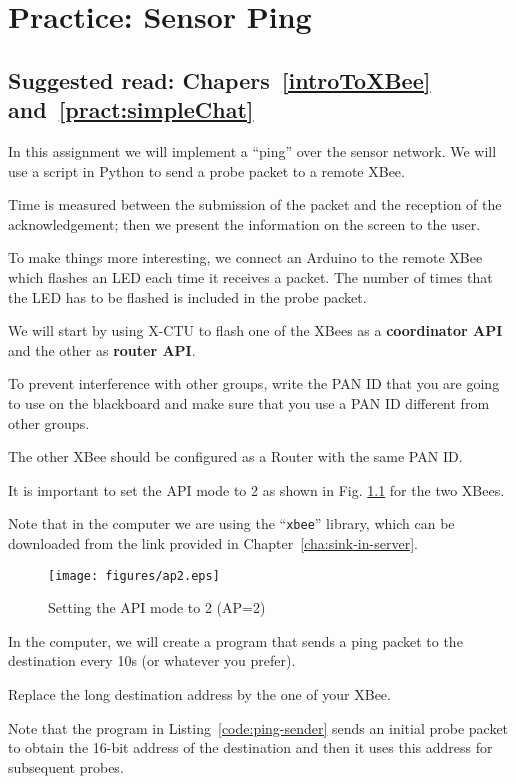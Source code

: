 \chapter{Practice: Sensor Ping}
\section*{Suggested read: Chapers~\ref{introToXBee} and~\ref{pract:simpleChat}}

In this assignment we will implement a ``ping'' over the sensor network. We will use a script in Python to send a probe packet to a remote XBee.

Time is measured between the submission of the packet and the reception of the acknowledgement; then we present the information on the screen to the user.

To make things more interesting, we connect an Arduino to the remote XBee which flashes an LED each time it receives a packet.
The number of times that the LED has to be flashed is included in the probe packet.

We will start by using X-CTU to flash one of the XBees as a {\bfseries coordinator API} and the other as {\bfseries router API}.

To prevent interference with other groups, write the PAN ID that you are going to use on the blackboard and make sure that you use a PAN ID different from other groups.

The other XBee should be configured as a Router with the same PAN ID.

It is important to set the API mode to 2 as shown in Fig. \ref{fig:ap2} for the two XBees.

Note that in the computer we are using the ``\texttt{xbee}'' library, which can be downloaded from the link provided in Chapter~\ref{cha:sink-in-server}.


\begin{figure}[htbp]
  \centering
  \texttt{[image: figures/ap2.eps]}
  \caption{Setting the API mode to 2 (AP=2)}
  \label{fig:ap2}
\end{figure}

In the computer, we will create a program that sends a ping packet to the destination every 10s (or whatever you prefer).

Replace the long destination address by the one of your XBee.

Note that the program in Listing~\ref{code:ping-sender} sends an initial probe packet to obtain the 16-bit address of the destination and then it uses this address for subsequent probes.

